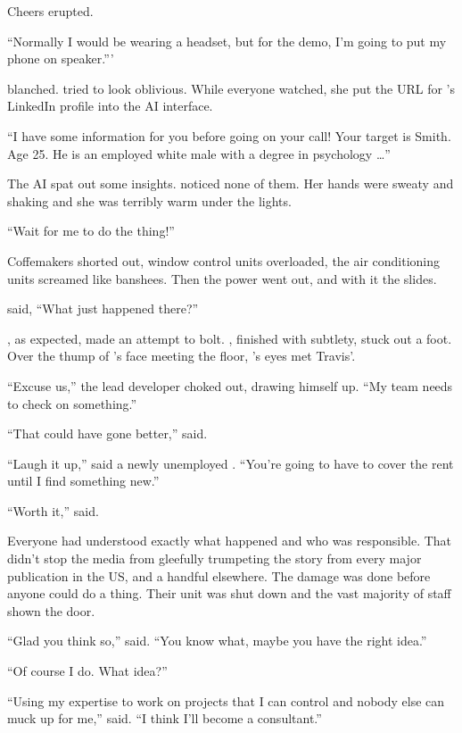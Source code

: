 Cheers erupted.

``Normally I would be wearing a headset, but for the demo, I'm going to put my phone on speaker.'''

\energyJerk{} blanched. {\protag} tried to look oblivious. While everyone watched, she put the URL for \energyJerk{}'s LinkedIn profile into the AI interface.

``I have some information for you before going on your call! Your target is \energyJerk{} Smith. Age 25. He is an employed white male with a degree in psychology \dots''

The AI spat out some insights. {\protag} noticed none of them. Her hands were sweaty and shaking and she was terribly warm under the lights.

``Wait for me to do the thing!''

Coffemakers shorted out, window control units overloaded, the air conditioning units screamed like banshees. Then the power went out, and with it the slides.

{\protag} said, ``What just happened there?''

\energyJerk{}, as expected, made an attempt to bolt. {\protag}, finished with subtlety, stuck out a foot. Over the thump of \energyJerk{}'s face meeting the floor, {\protag}'s eyes met Travis'.

``Excuse us,'' the lead developer choked out, drawing himself up. ``My team needs to check on something.''

\sectionBreak{}

``That could have gone better,'' {\sidetag} said.

``Laugh it up,'' said a newly unemployed {\protag}. ``You're going to have to cover the rent until I find something new.''

``Worth it,'' {\sidetag} said.

Everyone had understood exactly what happened and who was responsible. That didn't stop the media from gleefully trumpeting the story from every major publication in the US, and a handful elsewhere. The damage was done before anyone could do a thing. Their unit was shut down and the vast majority of staff shown the door.

``Glad you think so,'' {\protag} said. ``You know what, maybe you have the right idea.''

``Of course I do. What idea?''

``Using my expertise to work on projects that I can control and nobody else can muck up for me,'' {\protag} said. ``I think I'll become a consultant.''


